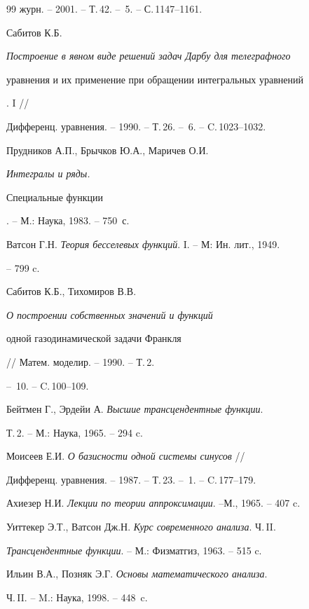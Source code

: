 \begin{thebibliography}{99}
журн. -- 2001. -- Т.\,42. -- \No\,5. -- С.\,1147--1161.




Сабитов К.Б. {\em Построение в явном виде решений задач Дарбу для телеграфного


уравнения и их применение при обращении интегральных уравнений}. I //


Дифференц. уравнения. -- 1990. -- Т.\,26. -- \No\,6. -- C.\,1023--1032.




Прудников А.П., Брычков Ю.А., Маричев О.И. {\em Интегралы и ряды.


Специальные функции}. -- М.: Наука, 1983. -- 750~с.




Ватсон Г.Н. {\em Теория бесселевых функций}. I. -- М: Ин. лит., 1949.


-- 799 c.




Сабитов К.Б., Тихомиров В.В. {\em О построении собственных значений и функций


одной газодинамической задачи Франкля} // Матем. моделир. -- 1990. -- Т.\,2.


-- \No\,10. -- C.\,100--109.




Бейтмен Г., Эрдейи А. {\em Высшие трансцендентные функции}.


Т.\,2. -- М.: Наука, 1965. -- 294 c.




Моисеев Е.И. {\em О базисности одной системы синусов} //


Дифференц. уравнения. -- 1987. -- Т.\,23. -- \No\,1. -- C.\,177--179.




Ахиезер Н.И. {\em Лекции по теории аппроксимации}. --М., 1965. -- 407 c.




Уиттекер Э.Т., Ватсон Дж.Н. {\em Курс современного анализа}. Ч.\,II. 


{\em Трансцендентные функции}. -- М.: Физматгиз, 1963. -- 515 c.




Ильин В.А., Позняк Э.Г. {\em Основы математического анализа}.


Ч.\,II. -- M.: Наука, 1998. -- 448~c.








\end{thebibliography}





\vskip 2cm



















\label{end}





